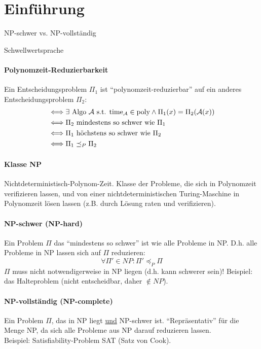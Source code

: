 \section{Einführung}

\begin{takeaway}
    \item NP-schwer vs. NP-vollständig
    \item Schwellwertsprache
\end{takeaway}

\paragraph{Polynomzeit-Reduzierbarkeit}
Ein Entscheidungsproblem $\Pi_1$ ist ``polynomzeit-reduzierbar'' auf ein anderes
Entscheidungsproblem $\Pi_2$:
\begin{align*}
& \Longleftrightarrow
\exists \text{ Algo } \mathcal{A} \text{ s.t. } \text{time}_{\mathcal{A}} \in \text{poly}
\wedge \Pi_1(x) = \Pi_2(\mathcal{A}(x))
\\
& \Longleftrightarrow
\Pi_2 \text{ mindestens so schwer wie } \Pi_1
\\
& \Longleftrightarrow
\Pi_1 \text{ höchstens so schwer wie } \Pi_2
\\
& \Longleftrightarrow
\Pi_1 \preceq_P \Pi_2
\end{align*}

\paragraph{Klasse NP}
Nichtdeterministisch-Polynom-Zeit.
Klasse der Probleme, die sich in Polynomzeit verifizieren lassen, und von einer nichtdeterministischen
Turing-Maschine in Polynomzeit lösen lassen (z.B. durch Lösung raten und verifizieren).

\paragraph{NP-schwer (NP-hard)}
Ein Problem $\Pi$ das ``mindestens so schwer'' ist wie alle Probleme in NP.
D.h. alle Probleme in NP lassen sich auf $\Pi$ reduzieren:
$$ \forall \Pi' \in NP : \Pi' \preceq_P \Pi $$
$\Pi$ muss nicht notwendigerweise in NP liegen (d.h. kann schwerer sein)!
Beispiel: das Halteproblem (nicht entscheidbar, daher $\notin NP$).

\paragraph{NP-vollständig (NP-complete)}
Ein Problem $\Pi$, das in NP liegt \underline{und} NP-schwer ist.
``Repräsentativ'' für die Menge NP, da sich alle Probleme aus NP darauf reduzieren lassen. \\
Beispiel: Satisfiability-Problem SAT (Satz von Cook).

